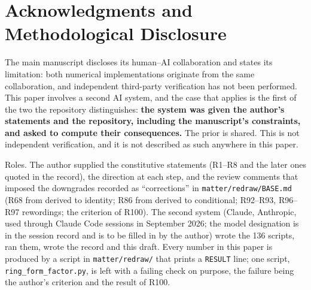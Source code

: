 \documentclass[11pt,a4paper]{article}
\theoremstyle{plain}
\theoremstyle{remark}
\begin{document}
\section*{Acknowledgments and Methodological Disclosure}\label{sec:disclosure}

The main manuscript discloses its human--AI collaboration and states its limitation: both
numerical implementations originate from the same collaboration, and independent third-party
verification has not been performed. This paper involves a second AI system, and the case that
applies is the first of the two the repository distinguishes: \textbf{the system was given the
author's statements and the repository, including the manuscript's constraints, and asked to
compute their consequences.} The prior is shared. This is not independent verification, and it is
not described as such anywhere in this paper.

Roles. The author supplied the constitutive statements (R1--R8 and the later ones quoted in the
record), the direction at each step, and the review comments that imposed the downgrades recorded
as ``corrections'' in \texttt{matter/redraw/BASE.md} (R68 from derived to identity; R86 from
derived to conditional; R92--R93, R96--R97 rewordings; the criterion of R100). The second system
(Claude, Anthropic, used through Claude Code sessions in September 2026; the model designation is
in the session record and is to be filled in by the author) wrote the 136 scripts, ran them,
wrote the record and this draft. Every number in this paper is produced by a script in
\texttt{matter/redraw/} that prints a \texttt{RESULT} line; one script,
\texttt{ring\_form\_factor.py}, is left with a failing check on purpose, the failure being the
author's criterion and the result of R100.
\end{document}
